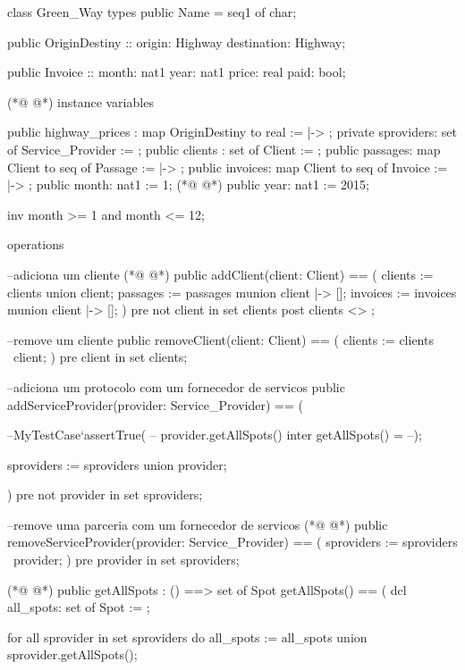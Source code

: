 \begin{vdmpp}[breaklines=true]
class Green_Way
types
   public Name = seq1 of char;
   
   public OriginDestiny :: origin: Highway
               destination: Highway;
  
  public Invoice :: month: nat1
      year: nat1
      price: real
      paid: bool;

(*@
\label{removeClient:13}
@*)
instance variables

  public highway_prices : map OriginDestiny to real := { |-> };
 private sproviders: set of Service_Provider := { };
 public clients : set of Client := {};
 public passages: map Client to seq of Passage := { |-> };
 public invoices: map Client to seq of Invoice := { |-> };
 public month: nat1 := 1;
(*@
\label{addServiceProvider:21}
@*)
 public year: nat1 := 2015;
 
 inv month >= 1 and month <= 12;

operations

 --adiciona um cliente
(*@
\label{addClient:28}
@*)
  public addClient(client: Client) ==
  (
    clients := clients union {client};
    passages := passages munion {client |-> []};
    invoices := invoices munion {client |-> []};
  )
  pre
   not client in set clients
  post 
    clients <> {};

  --remove um cliente    
  public removeClient(client: Client) == 
  (  
  clients := clients \ {client};
  )
  pre
   client in set clients;
   
  --adiciona um protocolo com um fornecedor de servicos 
 public addServiceProvider(provider: Service_Provider) == (
  
  --MyTestCase`assertTrue(
    -- provider.getAllSpots() inter getAllSpots() = {}
    --);
 
  sproviders := sproviders union {provider};

 )
 pre
  not provider in set sproviders;
  
 --remove uma parceria com um fornecedor de servicos
(*@
\label{removeServiceProvider:61}
@*)
 public removeServiceProvider(provider: Service_Provider) == 
  (  
  sproviders := sproviders \ {provider};
  )
  pre
   provider in set sproviders;
   
(*@
\label{getAllSpots:68}
@*)
  public getAllSpots : () ==> set of Spot
 getAllSpots() == (
   dcl all_spots: set of Spot := {};
   
   for all sprovider in set sproviders do
     all_spots := all_spots union sprovider.getAllSpots();
     

\end{vdmpp}
